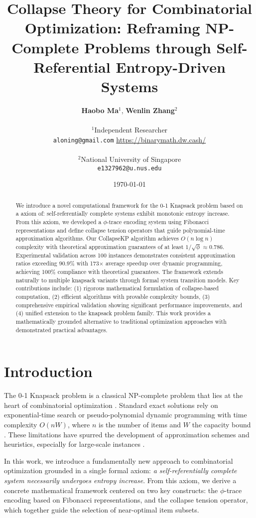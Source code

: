 \documentclass[11pt]{article}
\title{Collapse Theory for Combinatorial Optimization: Reframing NP-Complete Problems through Self-Referential Entropy-Driven Systems}
\author{
    \textbf{Haobo Ma}$^{1}$, \textbf{Wenlin Zhang}$^{2}$\\
    \\
    $^{1}$Independent Researcher\\
    \texttt{aloning@gmail.com} \quad \url{https://binarymath.dw.cash/}\\
    \\
    $^{2}$National University of Singapore\\
    \texttt{e1327962@u.nus.edu}
}
\date{\today}
\theoremstyle{remark}
\theoremstyle{definition}
\begin{document}
\maketitle

\begin{abstract}
We introduce a novel computational framework for the 0-1 Knapsack problem based on a axiom of: self-referentially complete systems exhibit monotonic entropy increase. From this axiom, we developed a $\phi$-trace encoding system using Fibonacci representations and define collapse tension operators that guide polynomial-time approximation algorithms. Our CollapseKP algorithm achieves $O(n \log n)$ complexity with theoretical approximation guarantees of at least $1/\sqrt{\phi} \approx 0.786$. Experimental validation across 100 instances demonstrates consistent approximation ratios exceeding 90.9\% with 173$\times$ average speedup over dynamic programming, achieving 100\% compliance with theoretical guarantees. The framework extends naturally to multiple knapsack variants through formal system transition models. Key contributions include: (1) rigorous mathematical formulation of collapse-based computation, (2) efficient algorithms with provable complexity bounds, (3) comprehensive empirical validation showing significant performance improvements, and (4) unified extension to the knapsack problem family. This work provides a mathematically grounded alternative to traditional optimization approaches with demonstrated practical advantages.
\end{abstract}

\section{Introduction}

The 0-1 Knapsack problem is a classical NP-complete problem that lies at the heart of combinatorial optimization \cite{garey1979computers}. Standard exact solutions rely on exponential-time search or pseudo-polynomial dynamic programming with time complexity $O(nW)$, where $n$ is the number of items and $W$ the capacity bound \cite{martello1990knapsack}. These limitations have spurred the development of approximation schemes and heuristics, especially for large-scale instances \cite{hochbaum1996approximation}.

In this work, we introduce a fundamentally new approach to combinatorial optimization grounded in a single formal axiom: \emph{a self-referentially complete system necessarily undergoes entropy increase}. From this axiom, we derive a concrete mathematical framework centered on two key constructs: the $\phi$-trace encoding based on Fibonacci representations, and the collapse tension operator, which together guide the selection of near-optimal item subsets.
\end{document}
